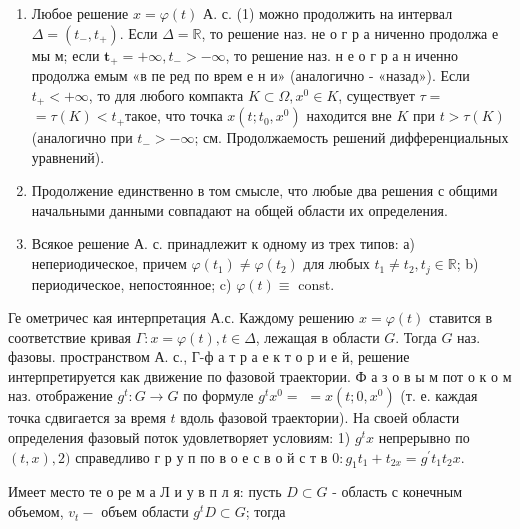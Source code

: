 \documentclass[10pt]{article}
\begin{document}
\begin{enumerate}

  \item Любое решение $x=\varphi(t)$ А. с. (1) можно продолжить на интервал $\Delta=\left(t_{-}, t_{+}\right)$. Если $\Delta=\mathbb{R}$, то решение наз. не о г р а ниченно продолжа е мы м; если $\boldsymbol{t}_{+}=+\infty, t_{-}>-\infty$, то решение наз. н е о г р а н иченно продолжа емым «в пе ред по врем е н и» (аналогично - «назад»). Если $t_{+}<+\infty$, то для любого компакта $K \subset \Omega, x^{0} \in K$, существует $\tau=$ $=\tau(K)<t_{+}$такое, что точка $x\left(t ; t_{0}, x^{0}\right)$ находится вне $K$ при $t>\tau(K)$ (аналогично при $t_{-}>-\infty$; см. Продолжаемость решений дифференциальных уравнений).



  \item Продолжение единственно в том смысле, что любые два решения с общими начальными данными совпадают на общей области их определения.



  \item Всякое решение А. с. принадлежит к одному из трех типов: а) непериодическое, причем $\varphi\left(t_{1}\right) \neq \varphi\left(t_{2}\right)$ для любых $t_{1} \neq t_{2}, t_{j} \in \mathbb{R}$; b) периодическое, непостоянное; c) $\varphi(t) \equiv$ const.



\end{enumerate}



Ге ометричес кая интерпретация А.с. Каждому решению $x=\varphi(t)$ ставится в соответствие кривая $\Gamma: x=\varphi(t), t \in \Delta$, лежащая в области $G$. Тогда $G$ наз. фазовы. пространством А. с., Г-ф а т р а е к т о р и е й, решение интерпретируется как движение по фазовой траектории. Ф а з о в ы м пот о к о м наз. отображение $g^{t}: G \rightarrow G$ по формуле $g^{t} x^{0}=$ $=x\left(t ; 0, x^{0}\right)$ (т. е. каждая точка сдвигается за время $t$ вдоль фазовой траектории). На своей области определения фазовый поток удовлетворяет условиям: 1) $g^{t} x$ непрерывно по $(t, x), 2)$ справедливо г р у п по в о е с в о й с т в $0: g_{1} t_{1}+t_{2 x}=g^{\prime} t_{1} t_{2} x$.



Имеет место те о ре м а Л и у в п л я: пусть $D \subset G$ - область с конечным объемом, $v_{t}-$ объем области $g^{t} D \subset G$; тогда
\end{document}
